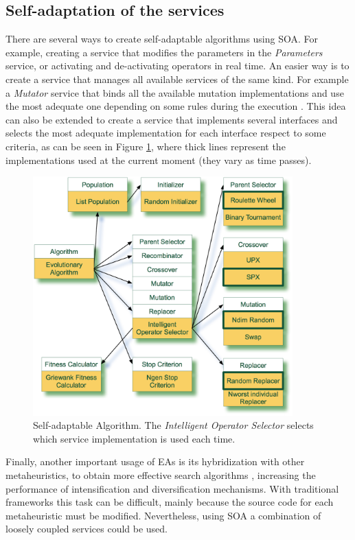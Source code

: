 \subsection{Self-adaptation of the services}
\label{sec:otherexamples}
There are several ways to create self-adaptable algorithms using SOA. For example, creating a service that modifies the parameters in the {\em Parameters} service, or activating and de-activating operators in real time. An easier way is to create a service that manages all available services of the same kind. For example a {\em Mutator} service that binds all the available mutation implementations and use the most adequate one depending on some rules during the execution \cite{SelfadaptationSerpell2010}.  This idea can also be extended to create a service that implements several interfaces and selects the most adequate implementation for each interface respect to some criteria, as can be seen in Figure \ref{INTELLIGENTALGORITHM}, where thick lines represent the implementations used at the current moment (they vary as time passes).



\begin{figure}
\centering
\includegraphics[width=10cm]{gfx/soaea/intelligent.jpg}
\caption{Self-adaptable Algorithm. The {\em Intelligent Operator Selector} selects which service implementation is used each time.}
\label{INTELLIGENTALGORITHM}
\end{figure}


Finally, another important usage of EAs is its hybridization with other metaheuristics, to obtain more effective search algorithms \cite{HybridRodriguez2012},  increasing the performance of intensification and diversification mechanisms. With  traditional frameworks this task can be difficult, mainly because the source code for each metaheuristic must be modified. Nevertheless, using SOA a combination of loosely coupled services could be used.



